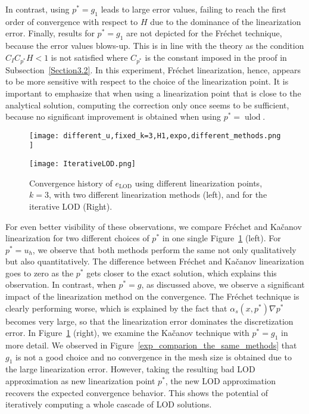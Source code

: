\documentclass{article}
\begin{document}
In contrast, using $p^*=g_1$ leads to large error values, failing to reach the first order of convergence with respect to $H$ due to the dominance of the linearization error. 
Finally, results for $p^*=g_1$ are not depicted for the Fréchet technique, because the error values blows-up. This is in line with the theory as the condition $C_IC_{p^*}H<1$ is not satisfied where $C_{p^*}$ is the constant imposed in the proof in Subsection~\ref{Section3.2}. 
In this experiment, Fréchet linearization, hence, appears to be more sensitive with respect to the choice of the linearization point. It is important to emphasize that when using a linearization point that is close to the analytical solution, computing the correction only once seems to be sufficient, because no significant improvement is obtained when using $p^*=\operatorname{ulod}$. 
\begin{figure}[ht]
    \centering
    \begin{minipage}{0.49\textwidth}
       \centering  
    \texttt{[image: different\_u,fixed\_k=3,H1,expo,different\_methods.png ]}
     
    \end{minipage}
    \hfill
    \begin{minipage}{0.49\textwidth}
         \centering  
    \texttt{[image: IterativeLOD.png]}
    \end{minipage}
    \caption{Convergence history of $e_{\operatorname{LOD}}$ using different linearization points, $k=3$, with two different linearization methods (left), and for the iterative LOD (Right).}\label{exp_compariondiffere}
\end{figure} 
For even better visibility of these observations, we compare Fréchet and Kačanov linearization for two different choices of $p^*$ in one single Figure~\ref{exp_compariondiffere} (left). For $p^*=u_h$, we observe that both methods perform the same not only qualitatively but also quantitatively. The difference between Fréchet and Kačanov linearization goes to zero as the $p^*$ gets closer to the exact solution, which explains this observation. In contrast, when $p^*=g$, as discussed above, we observe a significant impact of the linearization method on the convergence. The Fréchet technique is clearly performing worse, which is explained by the fact that $\alpha_s(x,p^*)\nabla p^*$ becomes very large, so that the linearization error dominates the discretization error. In Figure~\ref{exp_compariondiffere} (right), we examine the Kačanov technique with $p^*=g_1$ in more detail. We observed in Figure~\ref{exp_comparion_the_same_methods} that $g_1$ is not a good choice and no convergence in the mesh size is obtained due to the large linearization error. However, taking the resulting bad LOD approximation as new linearization point $p^*$, the new LOD approximation recovers the expected convergence behavior. This shows the potential of iteratively computing a whole cascade of LOD solutions.  
\end{document}
